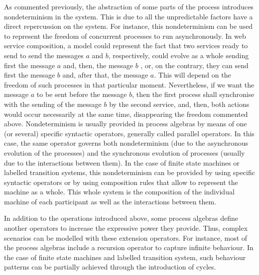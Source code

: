 As commented previously, the abstraction of some parts of the process introduces nondeterminism in the system.
This is due to all the unpredictable factors have a direct repercussion on the
system. For instance, this nondeterminism can be used to represent the freedom of concurrent processes
to run asynchronously. In web service composition, a model could represent the fact
that two services ready to send to send the messages $a$ and $b$, respectively, could
evolve as a whole sending first the message $a$ and, then, the message $b$ , or, on the contrary, they can send first the message $b$
and, after that, the message $a$. This will depend on the
freedom of such processes in that particular moment. Nevertheless, 
if we want the message $a$ to be sent before the message $b$, then the first process shall synchronise with
the sending of the message $b$ by the second service, and, then, both actions would occur
necessarily at the same time, disappearing the freedom commented above. 
Nondeterminism is usually provided in process algebras by means of
one (or several) specific syntactic operators, generally called parallel operators. 
In this case, the same operator governs both nondeterminism (due to the asynchronous evolution
of the processes) and the synchronous evolution of processes (usually due to the interactions between them).
In the case of finite state machines or labelled
transition systems, this nondeterminism can be provided by using specific syntactic operators
or by using composition rules that allow to represent the machine as a whole. This whole system is the composition
of the individual machine of each participant as well as the interactions between them.


In addition to the operations introduced above, some
process algebras define another operators to increase the expressive power they provide.
Thus, complex scenarios can be modelled with these extension operators. For instance, most of the process algebras 
include a recursion operator to capture infinite behaviour. 
In the case of finite state machines and
labelled transition system, such behaviour patterns
can be partially achieved through the introduction of cycles. 



